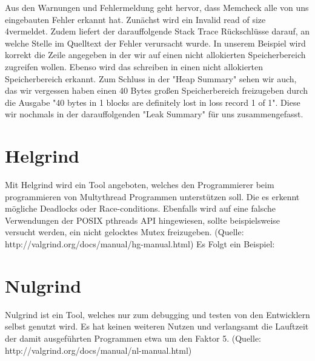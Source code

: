 Aus den Warnungen und Fehlermeldung geht hervor, dass Memcheck alle von uns eingebauten Fehler erkannt hat. Zunächst wird ein \glqq Invalid read of size 4\grqq  vermeldet. Zudem liefert der darauffolgende Stack Trace Rückschlüsse darauf, an welche Stelle im Quelltext der Fehler verursacht wurde. In unserem Beispiel wird korrekt die Zeile angegeben in der wir auf einen nicht allokierten Speicherbereich zugreifen wollen. Ebenso wird das schreiben in einen nicht allokierten Speicherbereich erkannt. Zum Schluss in der "Heap Summary" sehen wir auch, das wir vergessen haben einen 40 Bytes großen Speicherbereich freizugeben durch die Ausgabe "40 bytes in 1 blocks are definitely lost in loss record 1 of 1". Diese wir nochmals in der darauffolgenden "Leak Summary" für uns zusammengefasst.

\section{Helgrind}
Mit Helgrind wird ein Tool angeboten, welches den Programmierer beim programmieren von Multythread Programmen unterstützen soll. Die es erkennt mögliche Deadlocks oder Race-conditions. Ebenfalls wird auf eine falsche Verwendungen der POSIX pthreads API hingewiesen, sollte beispielsweise versucht werden, ein nicht gelocktes Mutex freizugeben.
(Quelle: http://valgrind.org/docs/manual/hg-manual.html)
Es Folgt ein Beispiel:

\section{Nulgrind}
Nulgrind ist ein Tool, welches nur zum debugging und testen von den Entwicklern selbst genutzt wird. Es hat keinen weiteren Nutzen und verlangsamt die Lauftzeit der damit ausgeführten Programmen etwa um den Faktor 5. (Quelle: http://valgrind.org/docs/manual/nl-manual.html)